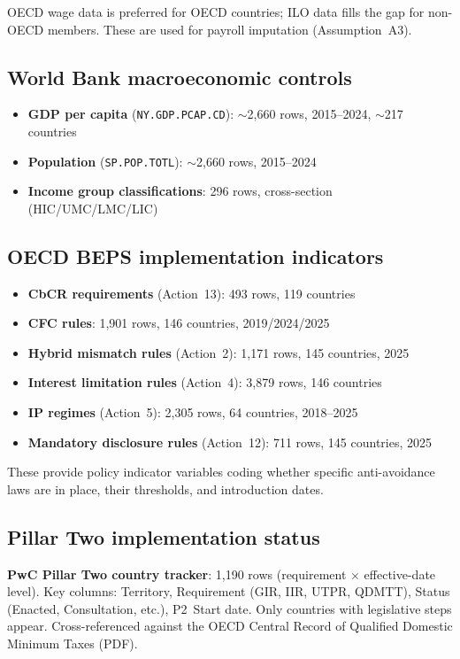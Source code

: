 \documentclass[11pt,a4paper]{article}
\newcommand{\code}[1]{\texttt{#1}}
\begin{document}
OECD wage data is preferred for OECD countries; ILO data fills the gap for non-OECD members. These are used for payroll imputation (Assumption~A3).

\subsection{World Bank macroeconomic controls}\label{app:worldbank}

\begin{itemize}[noitemsep]
\item \textbf{GDP per capita} (\code{NY.GDP.PCAP.CD}): $\sim$2,660 rows, 2015--2024, $\sim$217 countries
\item \textbf{Population} (\code{SP.POP.TOTL}): $\sim$2,660 rows, 2015--2024
\item \textbf{Income group classifications}: 296 rows, cross-section (HIC/UMC/LMC/LIC)
\end{itemize}

\subsection{OECD BEPS implementation indicators}\label{app:beps}

\begin{itemize}[noitemsep]
\item \textbf{CbCR requirements} (Action~13): 493 rows, 119 countries
\item \textbf{CFC rules}: 1,901 rows, 146 countries, 2019/2024/2025
\item \textbf{Hybrid mismatch rules} (Action~2): 1,171 rows, 145 countries, 2025
\item \textbf{Interest limitation rules} (Action~4): 3,879 rows, 146 countries
\item \textbf{IP regimes} (Action~5): 2,305 rows, 64 countries, 2018--2025
\item \textbf{Mandatory disclosure rules} (Action~12): 711 rows, 145 countries, 2025
\end{itemize}

These provide policy indicator variables coding whether specific anti-avoidance laws are in place, their thresholds, and introduction dates.

\subsection{Pillar Two implementation status}\label{app:pillar2}

\textbf{PwC Pillar Two country tracker}: 1,190 rows (requirement $\times$ effective-date level). Key columns: Territory, Requirement (GIR, IIR, UTPR, QDMTT), Status (Enacted, Consultation, etc.), P2~Start date. Only countries with legislative steps appear. Cross-referenced against the OECD Central Record of Qualified Domestic Minimum Taxes (PDF).
\end{document}
